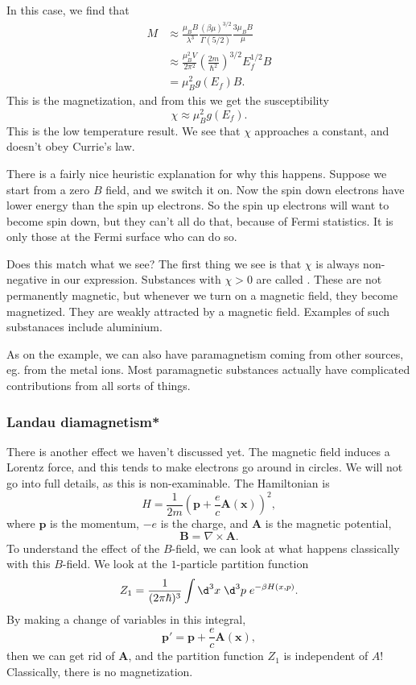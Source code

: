 \documentclass[a4paper]{article}
\begin{document}
In this case, we find that
\begin{align*}
  M &\approx \frac{\mu_BB}{\lambda^3} \frac{(\beta \mu)^{3/2}}{\Gamma(5/2)} \frac{3\mu_BB}{\mu} \\
  &\approx \frac{\mu_B^2 V}{2\pi^2}\left(\frac{2m}{\hbar^2}\right)^{3/2} E_f^{1/2} B\\
  &= \mu_B^2 g(E_f) B.
\end{align*}
This is the magnetization, and from this we get the susceptibility
\[
  \chi \approx \mu_B^2 g(E_f).
\]
This is the low temperature result. We see that $\chi$ approaches a constant, and doesn't obey Currie's law.

There is a fairly nice heuristic explanation for why this happens. Suppose we start from a zero $B$ field, and we switch it on. Now the spin down electrons have lower energy than the spin up electrons. So the spin up electrons will want to become spin down, but they can't all do that, because of Fermi statistics. It is only those at the Fermi surface who can do so.

Does this match what we see? The first thing we see is that $\chi$ is always non-negative in our expression. Substances with $\chi > 0$ are called . These are not permanently magnetic, but whenever we turn on a magnetic field, they become magnetized. They are weakly attracted by a magnetic field. Examples of such substanaces include aluminium.

As on the example, we can also have paramagnetism coming from other sources, eg. from the metal ions. Most paramagnetic substances actually have complicated contributions from all sorts of things.

\subsubsection*{Landau diamagnetism*}
There is another effect we haven't discussed yet. The magnetic field induces a Lorentz force, and this tends to make electrons go around in circles. We will not go into full details, as this is non-examinable. The Hamiltonian is
\[
  H = \frac{1}{2m} (\mathbf{p} + \frac{e}{c} \mathbf{A}(\mathbf{x}))^2,
\]
where $\mathbf{p}$ is the momentum, $-e$ is the charge, and $\mathbf{A}$ is the magnetic potential,
\[
  \mathbf{B} = \nabla \times \mathbf{A}.
\]
To understand the effect of the $B$-field, we can look at what happens classically with this $B$-field. We look at the $1$-particle partition function
\[
  Z_1 = \frac{1}{(2\pi \hbar)^{3}} \int \d^3 x\; \d^3 p\; e^{-\beta H(x, p)}.
\]
By making a change of variables in this integral,
\[
  \mathbf{p}' = \mathbf{p} + \frac{e}{c} \mathbf{A}(\mathbf{x}),
\]
then we can get rid of $\mathbf{A}$, and the partition function $Z_1$ is independent of $A$! Classically, there is no magnetization.
\end{document}
